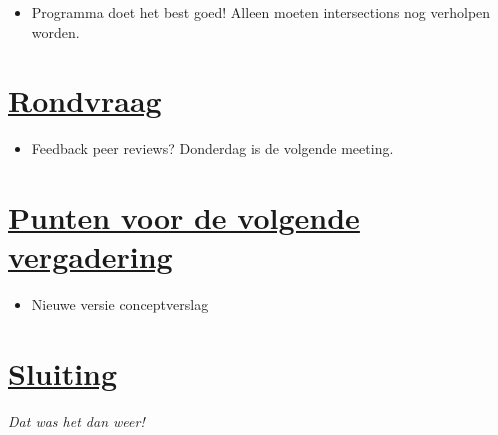 \documentclass[a4paper]{article}
\begin{document}
\begin{itemize}
\item Programma doet het best goed! Alleen moeten intersections nog verholpen worden.
\end{itemize}


\section{\underline{Rondvraag}} %
\label{sec:rondvraag}

\begin{itemize}
\item Feedback peer reviews? Donderdag is de volgende meeting.
\end{itemize}


\section{\underline{Punten voor de volgende vergadering}} %
\label{sec:punten_voor_de_volgende_vergadering}

\begin{itemize}
\item Nieuwe versie conceptverslag
\end{itemize}


\section{\underline{Sluiting}} %
\label{sec:sluiting}
\small{\emph{Dat was het dan weer!}}

\end{document}
